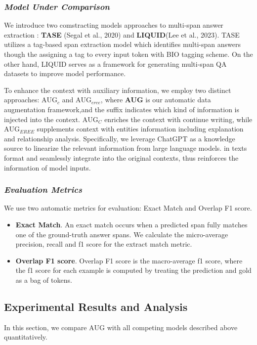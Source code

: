\documentclass[a4paper,fleqn,twocolumn]{cas-dc}
\newcommand{\1}[1]{\mathds{1}\left[#1\right]}
\begin{document}
	\subsubsection{\textit{Model Under Comparison}}
	\label{sec:baselines}
	We introduce two comstracting models approaches to multi-span answer extraction : \textbf{TASE} (Segal et al., 2020) and \textbf{LIQUID}(Lee et al., 2023). TASE utilizes a tag-based span extraction model which identifies multi-span answers though the assigning a tag to every input token with BIO tagging scheme. On the other hand, LIQUID serves as a framework for generating multi-span QA datasets to improve model performance.
	
	To enhance the context with auxiliary information, we employ two distinct   approaches: \textbf{$\text{AUG}_{c}$} and \textbf{$\text{AUG}_{eree}$}, where \textbf{AUG} is our automatic data augmentation framework,and the suffix indicates which kind of information is injected into the context. \textbf{$\text{AUG}_{C}$} enriches the context with continue writing, while \textbf{$\text{AUG}_{EREE}$} supplements context with entities information including explanation and relationship analysis.
	Specifically, we leverage ChatGPT as a knowledge source to linearize the relevant information from large language models. in texts format and seamlessly integrate into the original contexts, thus reinforces the information of model inputs.

	
	\subsubsection{\textit{Evaluation Metrics}}
	\label{sec:metrics}
	We use two automatic metrics for evaluation: Exact Match and Overlap F1 score.
	\begin{itemize}
		\item \textbf{Exact Match}. An exact match occurs when a predicted span fully matches one of the ground-truth
		answer spans. We calculate the micro-average precision, recall and f1 score for the extract match
		metric.
		
		\item \textbf{Overlap F1 score}. Overlap F1 score is the macro-average f1 score, where the f1 score for each
		example is computed by treating the prediction and gold as a bag of tokens.
	\end{itemize}


\subsection{Experimental Results and Analysis}
	In this section, we compare $\text{AUG}$ with all competing models described above quantitatively.
	
\end{document}
